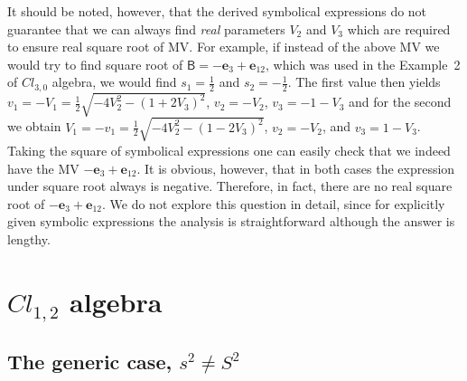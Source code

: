 \documentclass{birkjour}
\newcommand{\e}[1]{\mathbf{e}_{#1}} %
\newcommand{\cl}[2]{\ensuremath{\mathit{Cl}_{#1,#2}}}
\def\B{\mathsf{B}}
\def\e#1{\mathbf{e}_{#1}} %
\begin{document}
It should be noted, however, that the derived symbolical
expressions do not guarantee that we can always find {\it real}
parameters $V_2$ and $V_3$ which are required to ensure real
square root of MV. For example, if instead of the above MV we
would try to find square root of $\B=-\e{3}+\e{12}$, which was
used in the Example~2 of \cl{3}{0} algebra, we would find
$s_1=\tfrac{1}{2}$ and $s_2=-\tfrac{1}{2}$. The first value then
yields  $v_1=-V_1=\tfrac{1}{2} \sqrt{-4 V_2^2-(1+2 V_3)^2}$,
$v_2=-V_2$, $v_3=-1-V_3$ and for the second we obtain
$V_1=-v_1=\tfrac{1}{2} \sqrt{-4 V_2^2-(1-2 V_3)^2}$, $v_2=-V_2$,
and $v_3=1-V_3$. Taking the square of symbolical expressions one
can easily check that we indeed have the MV $-\e{3}+\e{12}$. It is
obvious, however, that in both cases the expression under square
root always is negative. Therefore, in fact, there are no real
square root of $-\e{3}+\e{12}$. We do not explore this question in
detail, since for explicitly given symbolic expressions the
analysis is straightforward although the answer is lengthy.



\section{\cl{1}{2} algebra}\label{sec:Cl12}

\subsection{The generic case, $s^2 \neq S^2$}
\end{document}
